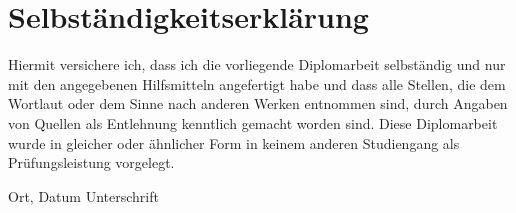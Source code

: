 \documentclass[twoside,12pt,a4paper]{report}
\begin{document}

\cleardoublepage







\cleardoublepage

\thispagestyle{empty}
\section*{Selbst\"andigkeitserkl\"arung}

Hiermit versichere ich, dass ich die vorliegende Diplomarbeit 
selbst\"andig und nur mit den angegebenen Hilfsmitteln angefertigt habe und dass alle Stellen, die dem Wortlaut oder dem 
Sinne nach anderen Werken entnommen sind, durch Angaben von Quellen als 
Entlehnung kenntlich gemacht worden sind. 
Diese Diplomarbeit wurde in gleicher oder \"ahnlicher Form in keinem anderen 
Studiengang als Pr\"ufungsleistung vorgelegt. 

\vskip 3cm

Ort, Datum	\hfill Unterschrift \hfill 
\end{document}

